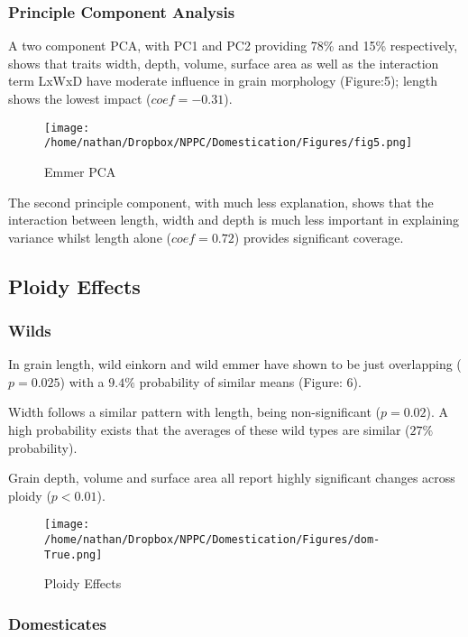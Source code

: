 \documentclass[a4paper, twocolumn]{article}
\begin{document}
\subsubsection{Principle Component Analysis}
\label{sec:org7eb0037}

A two component PCA, with PC1 and PC2 providing 78\% and 15\% respectively, shows that traits width, depth, volume, surface area as well as the interaction term LxWxD have moderate influence in grain morphology (Figure:5); length shows the lowest impact (\(coef = -0.31\)).

\begin{figure}[htbp]
\centering
\texttt{[image: /home/nathan/Dropbox/NPPC/Domestication/Figures/fig5.png]}
\caption{\label{fig:orgb0cee6d}
Emmer PCA}
\end{figure}

The second principle component, with much less explanation, shows that the interaction between length, width and depth is much less important in explaining variance whilst length alone (\(coef=0.72\)) provides significant coverage.


\subsection{Ploidy Effects}
\label{sec:org81fa363}

\subsubsection{Wilds}
\label{sec:orgddebd21}
In grain length, wild einkorn and wild emmer have shown to be just overlapping (\(p=0.025\)) with a \(9.4\%\) probability of similar means (Figure: 6).

Width follows a similar pattern with length, being non-significant (\(p=0.02\)). A high probability exists that the averages of these wild types are similar (\(27\%\) probability).

Grain depth, volume and surface area all report highly significant changes across ploidy (\(p<0.01\)).


\begin{figure}[htbp]
\centering
\texttt{[image: /home/nathan/Dropbox/NPPC/Domestication/Figures/dom-True.png]}
\caption{\label{fig:orgb82ae62}
Ploidy Effects}
\end{figure}


\subsubsection{Domesticates}
\label{sec:org5c9345d}
\end{document}
